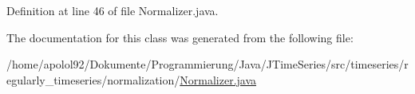 Definition at line 46 of file Normalizer.\+java.



The documentation for this class was generated from the following file\+:\begin{DoxyCompactItemize}
\item 
/home/apolol92/\+Dokumente/\+Programmierung/\+Java/\+J\+Time\+Series/src/timeseries/regularly\+\_\+timeseries/normalization/\hyperlink{_normalizer_8java}{Normalizer.\+java}\end{DoxyCompactItemize}
